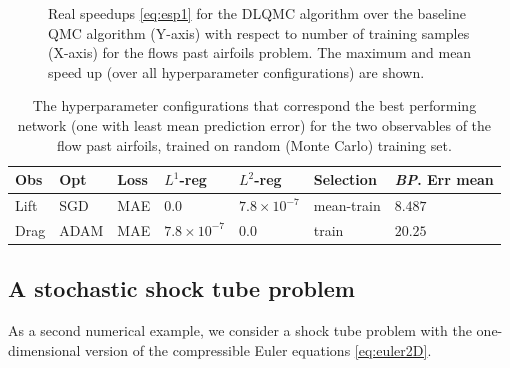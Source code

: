 \documentclass[a4paper]{article}
\numberwithin{equation}{section}
\numberwithin{equation}{section}
\theoremstyle{definition}
\theoremstyle{myremarkstyle}
\begin{document}
\begin{figure}[htbp]
\caption{Real speedups \eqref{eq:esp1} for the DLQMC algorithm over the baseline QMC algorithm (Y-axis) with respect to number of training samples (X-axis) for the flows past airfoils problem. The maximum and mean speed up (over all hyperparameter configurations)  are shown.}
\label{fig:afoilrspvsN}
\end{figure}
\begin{table}[htbp]
\centering
\begin{tabular}{|l|l|l|l|l|l|l|}
\hline
Obs & Opt & Loss & $L^1$-reg & $L^2$-reg & Selection & \emph{BP}. Err mean  \\
\hline
Lift & SGD & MAE & $0.0$ & $7.8\times 10^{-7}$ & mean-train & $8.487$    \\
\hline
Drag & ADAM & MAE & $7.8 \times 10^{-7}$ &$0.0$ &train & $20.25$  \\
\hline 
\end{tabular}
\caption{The hyperparameter configurations that correspond the best performing network (one with least mean prediction error) for the two observables of the flow past airfoils, trained on random (Monte Carlo) training set.}
\label{tab:MCtrain}
\end{table}
\subsection{A stochastic shock tube problem}
As a second numerical example, we consider a shock tube problem with the one-dimensional version of the compressible Euler equations \eqref{eq:euler2D}.  
\end{document}

